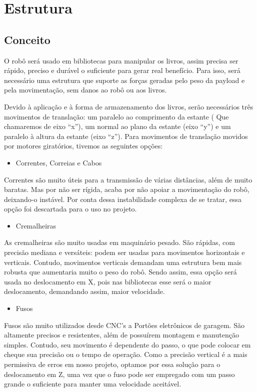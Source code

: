 

\section[Estrutura] {Estrutura}
\subsection{Conceito}

O robô será usado em bibliotecas para manipular os livros, assim precisa ser rápido, preciso e durável o suficiente para gerar real benefício. Para isso, será necessário uma estrutura que suporte as forças geradas pelo peso da payload e pela movimentação, sem danos ao robô ou aos livros.

Devido à aplicação e à forma de armazenamento dos livros, serão necessários três movimentos de translação: um paralelo ao comprimento da estante ( Que chamaremos de eixo “x”), um normal ao plano da estante (eixo “y”) e um paralelo à altura da estante (eixo “z”). Para movimentos de translação movidos por motores giratórios, tivemos as seguintes opções:
\begin{itemize}
\item{Correntes, Correias e Cabos}
\end{itemize}
Correntes são muito úteis para a transmissão de várias distâncias, além de muito baratas. Mas por não ser rígida, acaba por não apoiar a movimentação do robô, deixando-o instável. Por conta dessa instabilidade complexa de se tratar, essa opção foi descartada para o uso no projeto.  
\begin{itemize}
\item{Cremalheiras}
\end{itemize}
As cremalheiras são muito usadas em maquinário pesado. São rápidas, com precisão mediana e versáteis: podem ser usadas para movimentos horizontais e verticais. Contudo, movimentos verticais demandam uma estrutura bem mais robusta que aumentaria muito o peso do robô. Sendo assim, essa opção será usada no deslocamento em X, pois nas bibliotecas esse será o maior deslocamento, demandando assim, maior velocidade.
\begin{itemize}
\item{Fusos}
\end{itemize}
Fusos são muito utilizados desde CNC’s a Portões eletrônicos de garagem. São altamente precisos e resistentes, além de possuírem montagem e manutenção simples. Contudo, seu movimento é dependente do passo, o que pode colocar em cheque sua precisão ou o tempo de operação. Como a precisão vertical é a mais permissiva de erros em nosso projeto, optamos por essa solução para o deslocamento em Z, uma vez que o fuso pode ser empregado com um passo grande o suficiente para manter uma velocidade aceitável.
